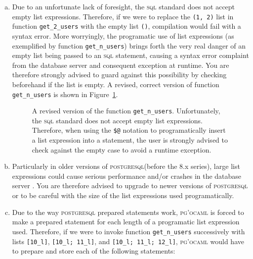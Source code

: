 \documentclass[11pt]{article}
\newcommand{\postgresql}{\textsc{postgresql}\xspace}
\newcommand{\sql}{\textsc{sql}\xspace}
\newcommand{\pgocaml}{\textsc{pg'ocaml}\xspace}
\newcommand{\displaycodesave}[1]{\fcolorbox{codeframe}{codeback}{\BUseVerbatim[numbers=right,formatcom=\color{codefront},fontsize=\footnotesize]{#1}}}
\begin{document}
\begin{enumerate}[a)]

\item

Due to an unfortunate lack of foresight, the \sql standard does not accept empty list
expressions.  Therefore, if we were to replace the \texttt{(1, 2)} list in function
\texttt{get\_2\_users} with the empty list \texttt{()}, compilation would fail with a
syntax error.  More worryingly, the programatic use of list expressions (as exemplified
by function \texttt{get\_n\_users}) brings forth the very real danger of an empty list
being passed to an \sql statement, causing a syntax error complaint from the database
server and consequent exception at runtime.  You are therefore strongly advised to guard
against this possibility by checking beforehand if the list is empty.  A revised, correct
version of function \texttt{get\_n\_users} is shown in Figure~\ref{fig:emptylist}.




\begin{figure}[!ht]
\centering
\displaycodesave{code:emptylist}
\caption{A revised version of the function \texttt{get\_n\_users}.  Unfortunately, the \sql
standard does not accept empty list expressions.  Therefore, when using the \texttt{\$@}
notation to programatically insert a list expression into a statement, the user is strongly
advised to check against the empty case to avoid a runtime exception.}
\label{fig:emptylist}
\end{figure}

\item

Particularly in older versions of \postgresql (before the 8.x series), large list
expressions could cause serious performance and/or crashes in the database server
\cite{listoops}.  You are therefore advised to upgrade to newer versions of \postgresql
or to be careful with the size of the list expressions used programatically.

\item

Due to the way \postgresql prepared statements work, \pgocaml is forced to make
a prepared statement for each length of a programatic list expression used.
Therefore, if we were to invoke function \texttt{get\_n\_users} successively with
lists \texttt{[10\_l]}, \texttt{[10\_l; 11\_l]}, and \texttt{[10\_l; 11\_l; 12\_l]},
\pgocaml would have to prepare and store each of the following statements:


\end{enumerate}
\end{document}
